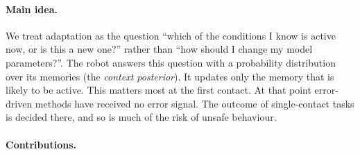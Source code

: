 \documentclass[10pt]{article}
\begin{document}
\paragraph{Main idea.}
We treat adaptation as the question ``which of the conditions I know is active now, or is this a new
one?'' rather than ``how should I change my model parameters?''. The robot answers this question with
a probability distribution over its memories (the \emph{context posterior}). It updates only the
memory that is likely to be active. This matters most at the first contact. At that point
error-driven methods have received no error signal. The outcome of single-contact tasks is decided
there, and so is much of the risk of unsafe behaviour.

\paragraph{Contributions.}
\end{document}
